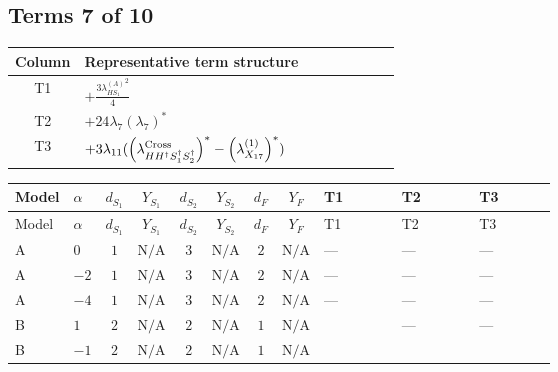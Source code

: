 \documentclass[8pt]{article}
\begin{document}
\begin{landscape}
\subsection*{Terms 7 of 10}
\begin{center}
\begin{tabular}{@{}c >{\raggedright\arraybackslash}p{0.82\linewidth}@{}}
\toprule
Column & Representative term structure \\
\midrule
T1 & \(\displaystyle +\frac{3 {\lambda_{HS_1}^{(A)}}^2}{4}\) \\
\midrule
T2 & \(\displaystyle +24 {\lambda_{7}} \left({\lambda_{7}}\right)^{*}\) \\
\midrule
T3 & \(\displaystyle +3 {\lambda_{11}} (\left({\lambda_{H H^\dagger S_1^\dagger S_2^\dagger}^{\rm Cross}}\right)^{*}-\left({\lambda_{X_{17}}^{(1)}}\right)^{*})\) \\
\midrule
\bottomrule
\end{tabular}
\end{center}
\smallskip
\tiny
\begin{longtable}{@{}llcccccc >{\raggedright\arraybackslash}p{0.21\linewidth} >{\raggedright\arraybackslash}p{0.21\linewidth} >{\raggedright\arraybackslash}p{0.21\linewidth}@{}}
\toprule
Model & $\alpha$ & $d_{S_1}$ & $Y_{S_1}$ & $d_{S_2}$ & $Y_{S_2}$ & $d_F$ & $Y_F$ & T1 & T2 & T3 \\
\midrule
\endfirsthead
\toprule
Model & $\alpha$ & $d_{S_1}$ & $Y_{S_1}$ & $d_{S_2}$ & $Y_{S_2}$ & $d_F$ & $Y_F$ & T1 & T2 & T3 \\
\midrule
\endhead
A & $0$ & $1$ & $\text{N/A}$ & $3$ & $\text{N/A}$ & $2$ & $\text{N/A}$ & --- & --- & --- \\
\midrule
A & $-2$ & $1$ & $\text{N/A}$ & $3$ & $\text{N/A}$ & $2$ & $\text{N/A}$ & --- & --- & --- \\
\midrule
A & $-4$ & $1$ & $\text{N/A}$ & $3$ & $\text{N/A}$ & $2$ & $\text{N/A}$ & --- & --- & --- \\
\midrule
B & $1$ & $2$ & $\text{N/A}$ & $2$ & $\text{N/A}$ & $1$ & $\text{N/A}$ & \scriptsize\adjustbox{max width=\linewidth}{$\begin{gathered} +\frac{3 {\lambda_{HS_1}^{(A)}}^2}{4}\end{gathered}$} & --- & --- \\
\midrule
B & $-1$ & $2$ & $\text{N/A}$ & $2$ & $\text{N/A}$ & $1$ & $\text{N/A}$ & \scriptsize\adjustbox{max width=\linewidth}{$\begin{gathered} +\frac{3 {\lambda_{HS_1}^{(A)}}^2}{4}\end{gathered}$} & \scriptsize\adjustbox{max width=\linewidth}{$\begin{gathered} +24 {\lambda_{7}} \left({\lambda_{7}}\right)^{*}\end{gathered}$} & \scriptsize\adjustbox{max width=\linewidth}{$\begin{gathered} +3 {\lambda_{11}} (\left({\lambda_{H H^\dagger S_1^\dagger S_2^\dagger}^{\rm Cross}}\right)^{*}-\left({\lambda_{X_{17}}^{(1)}}\right)^{*})\end{gathered}$} \\

\end{longtable}
\end{landscape}
\end{document}
